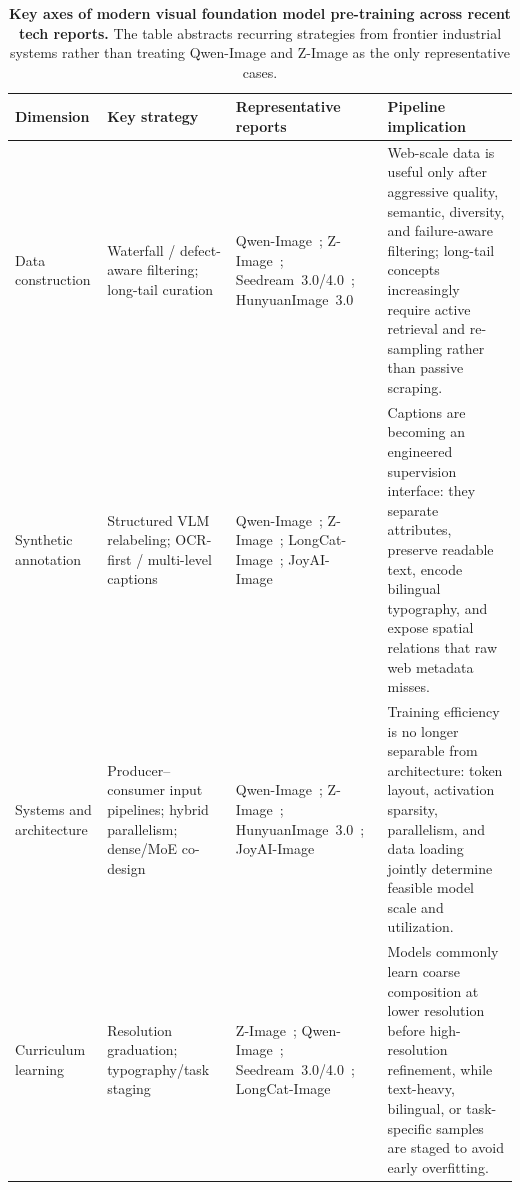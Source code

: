 \begin{table}[t]
\centering
\caption{\textbf{Key axes of modern visual foundation model pre-training across recent tech reports.} The table abstracts recurring strategies from frontier industrial systems rather than treating Qwen-Image and Z-Image as the only representative cases.}
\label{tab:pretrain_summary}
\scriptsize
\setlength{\tabcolsep}{3.5pt}
\renewcommand{\arraystretch}{1.16}
\begin{tabularx}{\textwidth}{@{}>{\raggedright\arraybackslash}p{2.6cm}>{\raggedright\arraybackslash}p{3.0cm}>{\raggedright\arraybackslash}p{4.6cm}>{\raggedright\arraybackslash}X@{}}
\toprule
\textbf{Dimension} & \textbf{Key strategy} & \textbf{Representative reports} & \textbf{Pipeline implication} \\
\midrule
Data construction & Waterfall / defect-aware filtering; long-tail curation & Qwen-Image~\citep{wu2025qwen}; Z-Image~\citep{cai2025z}; Seedream~3.0/4.0~\citep{gao2025seedream,seedream2025seedream}; HunyuanImage~3.0~\citep{cao2025hunyuanimage} & Web-scale data is useful only after aggressive quality, semantic, diversity, and failure-aware filtering; long-tail concepts increasingly require active retrieval and re-sampling rather than passive scraping. \\
\midrule
Synthetic annotation & Structured VLM relabeling; OCR-first / multi-level captions & Qwen-Image~\citep{wu2025qwen}; Z-Image~\citep{cai2025z}; LongCat-Image~\citep{team2025longcat}; JoyAI-Image~\citep{jdjoyaiimage} & Captions are becoming an engineered supervision interface: they separate attributes, preserve readable text, encode bilingual typography, and expose spatial relations that raw web metadata misses. \\
\midrule
Systems and architecture & Producer--consumer input pipelines; hybrid parallelism; dense/MoE co-design & Qwen-Image~\citep{wu2025qwen}; Z-Image~\citep{cai2025z}; HunyuanImage~3.0~\citep{cao2025hunyuanimage}; JoyAI-Image~\citep{jdjoyaiimage} & Training efficiency is no longer separable from architecture: token layout, activation sparsity, parallelism, and data loading jointly determine feasible model scale and utilization. \\
\midrule
Curriculum learning & Resolution graduation; typography/task staging & Z-Image~\citep{cai2025z}; Qwen-Image~\citep{wu2025qwen}; Seedream~3.0/4.0~\citep{gao2025seedream,seedream2025seedream}; LongCat-Image~\citep{team2025longcat} & Models commonly learn coarse composition at lower resolution before high-resolution refinement, while text-heavy, bilingual, or task-specific samples are staged to avoid early overfitting. \\

\end{tabularx}
\end{table}
